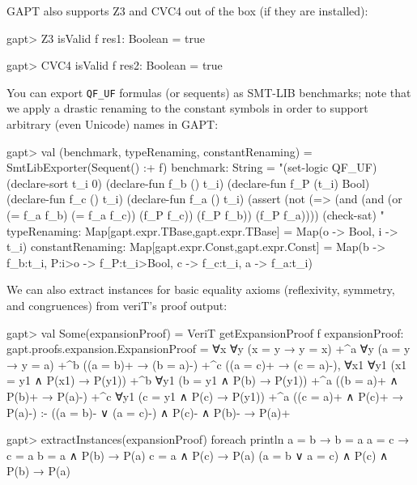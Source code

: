\documentclass[a4paper,11pt]{book}
\begin{document}
GAPT also supports Z3 and CVC4 out of the box (if they are installed):
\begin{clilisting}
gapt> Z3 isValid f
res1: Boolean = true

gapt> CVC4 isValid f
res2: Boolean = true

\end{clilisting}

You can export \verb,QF_UF, formulas (or sequents) as SMT-LIB benchmarks;
note that we apply a drastic renaming to the constant symbols in order to
support arbitrary (even Unicode) names in GAPT:
\begin{clilisting}
gapt> val (benchmark, typeRenaming, constantRenaming) = SmtLibExporter(Sequent() :+ f)
benchmark: String =
"(set-logic QF_UF)
(declare-sort t_i 0)
(declare-fun f_b () t_i)
(declare-fun f_P (t_i) Bool)
(declare-fun f_c () t_i)
(declare-fun f_a () t_i)
(assert
  (not
    (=> (and (and (or (= f_a f_b) (= f_a f_c)) (f_P f_c)) (f_P f_b))
      (f_P f_a))))
(check-sat)
"
typeRenaming: Map[gapt.expr.TBase,gapt.expr.TBase] = Map(o -> Bool, i -> t_i)
constantRenaming: Map[gapt.expr.Const,gapt.expr.Const] = Map(b -> f_b:t_i, P:i>o -> f_P:t_i>Bool, c -> f_c:t_i, a -> f_a:t_i)

\end{clilisting}

We can also extract instances for basic equality axioms (reflexivity, symmetry,
and congruences) from veriT's proof output:
\begin{clilisting}
gapt> val Some(expansionProof) = VeriT getExpansionProof f
expansionProof: gapt.proofs.expansion.ExpansionProof =
∀x ∀y (x = y → y = x)
  +^{a}
    ∀y (a = y → y = a)
    +^{b} ((a = b)+ → (b = a)-)
    +^{c} ((a = c)+ → (c = a)-),
∀x1 ∀y1 (x1 = y1 ∧ P(x1) → P(y1))
  +^{b} ∀y1 (b = y1 ∧ P(b) → P(y1)) +^{a} ((b = a)+ ∧ P(b)+ → P(a)-)
  +^{c} ∀y1 (c = y1 ∧ P(c) → P(y1)) +^{a} ((c = a)+ ∧ P(c)+ → P(a)-)
:-
((a = b)- ∨ (a = c)-) ∧ P(c)- ∧ P(b)- → P(a)+

gapt> extractInstances(expansionProof) foreach println
a = b → b = a
a = c → c = a
b = a ∧ P(b) → P(a)
c = a ∧ P(c) → P(a)
(a = b ∨ a = c) ∧ P(c) ∧ P(b) → P(a)

\end{clilisting}
\end{document}
